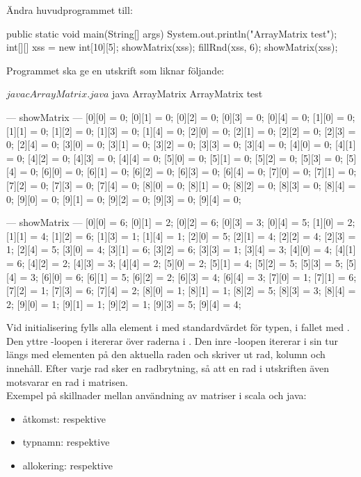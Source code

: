 Ändra huvudprogrammet till:
\begin{Code}[language=Java]
    public static void main(String[] args) {
        System.out.println("ArrayMatrix test");
        int[][] xss = new int[10][5];
        showMatrix(xss);
        fillRnd(xss, 6);
        showMatrix(xss);
    }
\end{Code}

Programmet ska ge en utskrift som liknar följande:
\begin{REPL}
$ javac ArrayMatrix.java
$ java ArrayMatrix
ArrayMatrix test

--- showMatrix ---
[0][0] = 0; [0][1] = 0; [0][2] = 0; [0][3] = 0; [0][4] = 0;
[1][0] = 0; [1][1] = 0; [1][2] = 0; [1][3] = 0; [1][4] = 0;
[2][0] = 0; [2][1] = 0; [2][2] = 0; [2][3] = 0; [2][4] = 0;
[3][0] = 0; [3][1] = 0; [3][2] = 0; [3][3] = 0; [3][4] = 0;
[4][0] = 0; [4][1] = 0; [4][2] = 0; [4][3] = 0; [4][4] = 0;
[5][0] = 0; [5][1] = 0; [5][2] = 0; [5][3] = 0; [5][4] = 0;
[6][0] = 0; [6][1] = 0; [6][2] = 0; [6][3] = 0; [6][4] = 0;
[7][0] = 0; [7][1] = 0; [7][2] = 0; [7][3] = 0; [7][4] = 0;
[8][0] = 0; [8][1] = 0; [8][2] = 0; [8][3] = 0; [8][4] = 0;
[9][0] = 0; [9][1] = 0; [9][2] = 0; [9][3] = 0; [9][4] = 0;

--- showMatrix ---
[0][0] = 6; [0][1] = 2; [0][2] = 6; [0][3] = 3; [0][4] = 5;
[1][0] = 2; [1][1] = 4; [1][2] = 6; [1][3] = 1; [1][4] = 1;
[2][0] = 5; [2][1] = 4; [2][2] = 4; [2][3] = 1; [2][4] = 5;
[3][0] = 4; [3][1] = 6; [3][2] = 6; [3][3] = 1; [3][4] = 3;
[4][0] = 4; [4][1] = 6; [4][2] = 2; [4][3] = 3; [4][4] = 2;
[5][0] = 2; [5][1] = 4; [5][2] = 5; [5][3] = 5; [5][4] = 3;
[6][0] = 6; [6][1] = 5; [6][2] = 2; [6][3] = 4; [6][4] = 3;
[7][0] = 1; [7][1] = 6; [7][2] = 1; [7][3] = 6; [7][4] = 2;
[8][0] = 1; [8][1] = 1; [8][2] = 5; [8][3] = 3; [8][4] = 2;
[9][0] = 1; [9][1] = 1; [9][2] = 1; [9][3] = 5; [9][4] = 4;

\end{REPL}

\SOLUTION

\TaskSolved \what

\SubtaskSolved  Vid initialisering fylls alla element i  med standardvärdet för typen,  i fallet med . Den yttre -loopen i  itererar över raderna i . Den inre -loopen itererar i sin tur längs med elementen på den aktuella raden och skriver ut rad, kolumn och innehåll. Efter varje rad sker en radbrytning, så att en rad i utskriften även motsvarar en rad i matrisen.\\
Exempel på skillnader mellan användning av matriser i scala och java:
\begin{itemize}
\item åtkomst:  respektive 
\item typnamn:  respektive  
\item allokering:  respektive 
\end{itemize}

